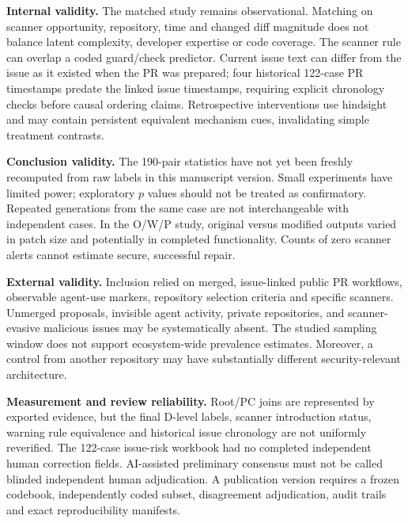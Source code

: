 \documentclass[journal,10pt,twoside]{IEEEtran}
\begin{document}
\textbf{Internal validity.} The matched study remains observational. Matching on scanner opportunity, repository, time and changed diff magnitude does not balance latent complexity, developer expertise or code coverage. The scanner rule can overlap a coded guard/check predictor. Current issue text can differ from the issue as it existed when the PR was prepared; four historical 122-case PR timestamps predate the linked issue timestamps, requiring explicit chronology checks before causal ordering claims. Retrospective interventions use hindsight and may contain persistent equivalent mechanism cues, invalidating simple treatment contrasts.

\textbf{Conclusion validity.} The 190-pair statistics have not yet been freshly recomputed from raw labels in this manuscript version. Small experiments have limited power; exploratory $p$ values should not be treated as confirmatory. Repeated generations from the same case are not interchangeable with independent cases. In the O/W/P study, original versus modified outputs varied in patch size and potentially in completed functionality. Counts of zero scanner alerts cannot estimate secure, successful repair.

\textbf{External validity.} Inclusion relied on merged, issue-linked public PR workflows, observable agent-use markers, repository selection criteria and specific scanners. Unmerged proposals, invisible agent activity, private repositories, and scanner-evasive malicious issues may be systematically absent. The studied sampling window does not support ecosystem-wide prevalence estimates. Moreover, a control from another repository may have substantially different security-relevant architecture.

\textbf{Measurement and review reliability.} Root/PC joins are represented by exported evidence, but the final D-level labels, scanner introduction status, warning rule equivalence and historical issue chronology are not uniformly reverified. The 122-case issue-risk workbook had no completed independent human correction fields. AI-assisted preliminary consensus must not be called blinded independent human adjudication. A publication version requires a frozen codebook, independently coded subset, disagreement adjudication, audit trails and exact reproducibility manifests.
\end{document}
